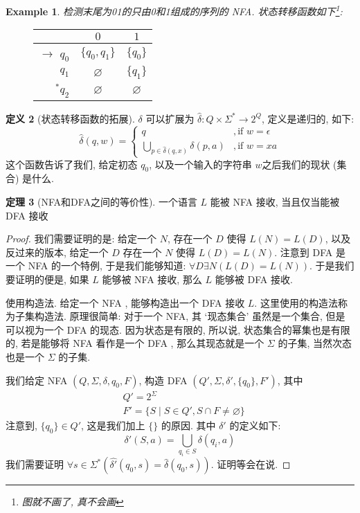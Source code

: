 \documentclass[12pt]{ctexart}
\theoremstyle{definition}
\theoremstyle{definition}
\newtheorem{definition}{定义}[section]
\newtheorem{thm}[definition]{定理}
\theoremstyle{plain}
\newtheorem{exam}[definition]{Example}
\begin{document}
\begin{exam}
检测末尾为01的只由0和1组成的序列的 NFA. 状态转移函数如下\footnote{图就不画了, 真不会画}: 
\begin{figure}[h]
\centering
\begin{tabular}{|r|cc|}
\hline
& \(0\) & \(1\) \\ 
\hline 
$\to$ \(q_{0}\) & \(\{ q_{0}, q_{1}\}\) & \(\{q_{0}\}\)\\ 
\(q_{1	}\) & $\varnothing$ & \(\{q_{1} \}\) \\
\(^{*}q_{2}\) & $\varnothing$ & $\varnothing$\\
\hline
\end{tabular}
\end{figure}

\end{exam}
\begin{definition}[状态转移函数的拓展]
\(\delta\) 可以扩展为 \(\hat{\delta}\colon Q \times \Sigma ^{*} \to 2^{Q}\), 定义是递归的, 如下:
\[
\hat{\delta}(q, w) = 
\begin{cases}
q &, \text{if } w = \epsilon \\
\bigcup_{p\in \hat{\delta}(q,x)} \delta(p,a) & , \text{if } w = xa
\end{cases}
\]
这个函数告诉了我们, 给定初态 \(q_{0}\), 以及一个输入的字符串 \(w\)之后我们的现状 (集合) 是什么. 
\end{definition}
\begin{thm}[NFA和DFA之间的等价性]\label{Thm:nfa=dfa}
一个语言 \(L\) 能被 NFA 接收, 当且仅当能被 DFA 接收
\end{thm}
\begin{proof}
我们需要证明的是: 给定一个 \(N\), 存在一个 \(D\) 使得 \(L (N) = L (D) \), 以及反过来的版本, 给定一个 \(D\) 存在一个 \(N\) 使得 \(L (D) = L(N)\).
注意到 DFA 是一个 NFA 的一个特例, 于是我们能够知道: \(\forall D \exists N (L(D) = L(N)) \). 于是我们要证明的便是, 如果 \(L\) 能够被 NFA 接收, 那么 \(L\) 能够被 DFA 接收. 

使用构造法. 给定一个 NFA , 能够构造出一个 DFA 接收 \(L\). 这里使用的构造法称为子集构造法. 原理很简单: 对于一个 NFA, 其 `现态集合' 虽然是一个集合, 但是可以视为一个 DFA 的现态. 因为状态是有限的, 所以说, 状态集合的幂集也是有限的, 若是能够将 NFA 看作是一个 DFA , 那么其现态就是一个 \(\Sigma\) 的子集, 当然次态也是一个 \(\Sigma\) 的子集. 

我们给定 NFA \((Q,\Sigma,\delta, q_{0},F)\), 构造 DFA \((Q' , \Sigma, \delta ' , \{q_{0}\}, F')\), 其中 
\[
\begin{aligned}
& Q '  =  2 ^{\Sigma} \\ 
& F' = \{ S \mid S \in Q ', S \cap F  \ne \varnothing \}
\end{aligned}
\]
注意到, \(\{q_{0}\}\in Q'\), 这是我们加上 \(\{\}\) 的原因. 其中 \(\delta '\) 的定义如下: 
\[
\delta ' (S, a) = \bigcup_{q_{i} \in S} \delta (q_{i}, a) 
\]
我们需要证明 \(\forall s \in \Sigma ^{*} (\hat{\delta'} (q_{0}, s) = \hat{\delta} (q_{0},s))\). 证明等会在说. 
\end{proof}
\end{document}
